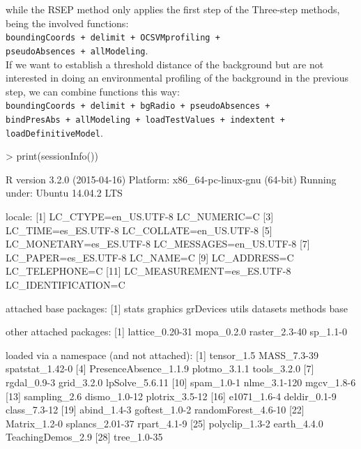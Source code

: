 \documentclass[10pt,a4paper]{article}
\begin{document}
while the RSEP method only applies the first step of the Three-step methods, being the involved functions:\\

   \texttt{boundingCoords + delimit + OCSVMprofiling +} \\
   \texttt{pseudoAbsences + allModeling}. \\
 
If we want to establish a threshold distance of the background but are not interested in doing an environmental profiling of the background in the previous step, we can combine functions this way:\\

  \texttt{boundingCoords + delimit + bgRadio + pseudoAbsences +}\\ 
  \texttt{bindPresAbs + allModeling + loadTestValues + indextent +}\\
  \texttt{loadDefinitiveModel}.


\begin{Schunk}
\begin{Sinput}
> print(sessionInfo())
\end{Sinput}
\begin{Soutput}
R version 3.2.0 (2015-04-16)
Platform: x86_64-pc-linux-gnu (64-bit)
Running under: Ubuntu 14.04.2 LTS

locale:
 [1] LC_CTYPE=en_US.UTF-8       LC_NUMERIC=C              
 [3] LC_TIME=es_ES.UTF-8        LC_COLLATE=en_US.UTF-8    
 [5] LC_MONETARY=es_ES.UTF-8    LC_MESSAGES=en_US.UTF-8   
 [7] LC_PAPER=es_ES.UTF-8       LC_NAME=C                 
 [9] LC_ADDRESS=C               LC_TELEPHONE=C            
[11] LC_MEASUREMENT=es_ES.UTF-8 LC_IDENTIFICATION=C       

attached base packages:
[1] stats     graphics  grDevices utils     datasets  methods   base     

other attached packages:
[1] lattice_0.20-31 mopa_0.2.0      raster_2.3-40   sp_1.1-0       

loaded via a namespace (and not attached):
 [1] tensor_1.5            MASS_7.3-39           spatstat_1.42-0      
 [4] PresenceAbsence_1.1.9 plotmo_3.1.1          tools_3.2.0          
 [7] rgdal_0.9-3           grid_3.2.0            lpSolve_5.6.11       
[10] spam_1.0-1            nlme_3.1-120          mgcv_1.8-6           
[13] sampling_2.6          dismo_1.0-12          plotrix_3.5-12       
[16] e1071_1.6-4           deldir_0.1-9          class_7.3-12         
[19] abind_1.4-3           goftest_1.0-2         randomForest_4.6-10  
[22] Matrix_1.2-0          splancs_2.01-37       rpart_4.1-9          
[25] polyclip_1.3-2        earth_4.4.0           TeachingDemos_2.9    
[28] tree_1.0-35          
\end{Soutput}
\end{Schunk}
\end{document}
